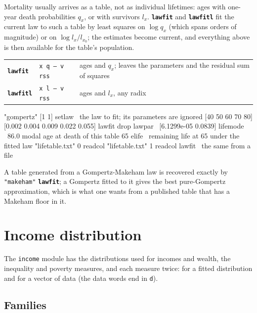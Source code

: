 \documentclass[11pt,letterpaper]{article}
\newcommand{\code}[1]{\texttt{#1}}
\newcommand{\cmd}[1]{\texttt{\textbf{#1}}}
\newcommand{\stk}[1]{\texttt{#1}}
\begin{document}
Mortality usually arrives as a table, not as individual lifetimes: ages with one-year death probabilities $q_x$, or with survivors $l_x$. \cmd{lawfit} and \cmd{lawfitl} fit the current law to such a table by least squares on $\log q_x$ (which spans orders of magnitude) or on $\log l_x/l_{x_0}$; the estimates become current, and everything above is then available for the table's population.
\begin{center}
\begin{tabular}{@{}l>{\raggedright\arraybackslash}p{}>{\raggedright\arraybackslash}p{}@{}}
\toprule
\cmd{lawfit} & \stk{x q -- v rss} & ages and $q_x$; leaves the parameters and the residual sum of squares \\
\cmd{lawfitl} & \stk{x l -- v rss} & ages and $l_x$, any radix \\
\bottomrule
\end{tabular}
\end{center}
\begin{rpn}
"gompertz" [1 1] setlaw                  \ the law to fit; its parameters are ignored
[40 50 60 70 80] [0.002 0.004 0.009 0.022 0.055] lawfit
drop lawpar                              \ [6.1299e-05 0.0839]
lifemode                                 \ 86.0       modal age at death of this table
65 elife                                 \ remaining life at 65 under the fitted law
"lifetable.txt" 0 readcol "lifetable.txt" 1 readcol lawfit   \ the same from a file
\end{rpn}
A table generated from a Gompertz-Makeham law is recovered exactly by \code{"makeham"} \cmd{lawfit}; a Gompertz fitted to it gives the best pure-Gompertz approximation, which is what one wants from a published table that has a Makeham floor in it.

\section{Income distribution}
\label{sec:income}

The \code{income} module has the distributions used for incomes and wealth, the inequality and poverty measures, and each measure twice: for a fitted distribution and for a vector of data (the data words end in \code{d}).

\subsection{Families}
\end{document}

